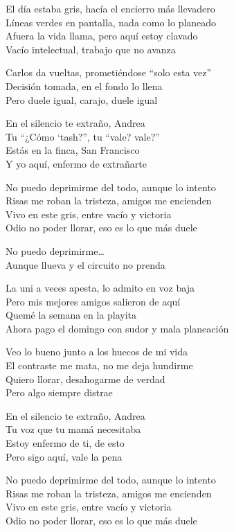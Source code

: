 \begin{lyrics}
El día estaba gris, hacía el encierro más llevadero\\
Líneas verdes en pantalla, nada como lo planeado\\
Afuera la vida llama, pero aquí estoy clavado\\
Vacío intelectual, trabajo que no avanza

Carlos da vueltas, prometiéndose “solo esta vez”\\
Decisión tomada, en el fondo lo llena\\
Pero duele igual, carajo, duele igual

En el silencio te extraño, Andrea\\
Tu “¿Cómo ‘tash?”, tu “vale? vale?”\\
Estás en la finca, San Francisco\\
Y yo aquí, enfermo de extrañarte

No puedo deprimirme del todo, aunque lo intento\\
Risas me roban la tristeza, amigos me encienden\\
Vivo en este gris, entre vacío y victoria\\
Odio no poder llorar, eso es lo que más duele

No puedo deprimirme…\\
Aunque llueva y el circuito no prenda

La uni a veces apesta, lo admito en voz baja\\
Pero mis mejores amigos salieron de aquí\\
Quemé la semana en la playita\\
Ahora pago el domingo con sudor y mala planeación

Veo lo bueno junto a los huecos de mi vida\\
El contraste me mata, no me deja hundirme\\
Quiero llorar, desahogarme de verdad\\
Pero algo siempre distrae

En el silencio te extraño, Andrea\\
Tu voz que tu mamá necesitaba\\
Estoy enfermo de ti, de esto\\
Pero sigo aquí, vale la pena

No puedo deprimirme del todo, aunque lo intento\\
Risas me roban la tristeza, amigos me encienden\\
Vivo en este gris, entre vacío y victoria\\
Odio no poder llorar, eso es lo que más duele


\end{lyrics}
